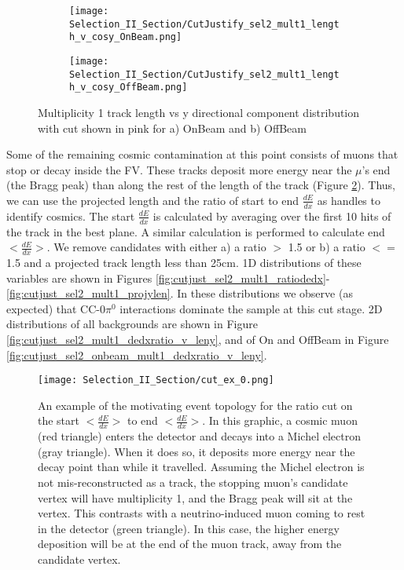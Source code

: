 \begin{figure}[h!]
\centering
  \begin{subfigure}[t]{0.25\textwidth}
    \centering
\texttt{[image: Selection\_II\_Section/CutJustify\_sel2\_mult1\_length\_v\_cosy\_OnBeam.png]}
    \caption{ }
  \end{subfigure} 
  \hspace{20mm}
  \begin{subfigure}[t]{0.25\textwidth}
    \centering
    \texttt{[image: Selection\_II\_Section/CutJustify\_sel2\_mult1\_length\_v\_cosy\_OffBeam.png]}
    \caption{ }
  \end{subfigure} 
\caption{Multiplicity 1 track length vs y directional component distribution with cut shown in pink for a) OnBeam and b) OffBeam }
\label{fig:cutjust_sel2_onbeam_mult1_len_v_cosy}
\end{figure}

\par Some of the remaining cosmic contamination at this point consists of muons that stop or decay inside the FV.  These tracks deposit more energy near the $\mu$'s end (the Bragg peak) than along the rest of the length of the track (Figure \ref{fig:cut_ex_0}). Thus, we can use the projected length and the ratio of start to end $\frac{dE}{dx}$ as handles to identify cosmics. The start $\frac{dE}{dx}$ is calculated by averaging over the first 10 hits of the track in the best plane. A similar calculation is performed to calculate end $<\frac{dE}{dx}>$. We remove candidates with either a) a ratio $>$ 1.5 or b) a ratio $<=$ 1.5 and a projected track length less than 25cm.  1D distributions of these variables are shown in Figures \ref{fig:cutjust_sel2_mult1_ratiodedx}-\ref{fig:cutjust_sel2_mult1_projylen}.  In these distributions we observe (as expected) that CC-0$\pi^0$ interactions dominate the sample at this cut stage. 2D distributions of all backgrounds are shown in Figure \ref{fig:cutjust_sel2_mult1_dedxratio_v_leny}, and of On and OffBeam in Figure \ref{fig:cutjust_sel2_onbeam_mult1_dedxratio_v_leny}.



\begin{figure}[H]
\centering
\texttt{[image: Selection\_II\_Section/cut\_ex\_0.png]}
\caption{An example of the motivating event topology for the ratio cut on the start $<\frac{dE}{dx}>$ to end $<\frac{dE}{dx}>$. In this graphic, a cosmic muon (red triangle) enters the detector and decays into a Michel electron (gray triangle). When it does so, it deposits more energy near the decay point than while it travelled.  Assuming the Michel electron is not mis-reconstructed as a track, the stopping muon’s candidate vertex will have multiplicity 1, and the Bragg peak will sit at the vertex. This contrasts with a neutrino-induced muon coming to rest in the detector (green triangle).  In this case, the higher energy deposition will be at the end of the muon track, away from the candidate vertex. }
\label{fig:cut_ex_0}
\end{figure}


